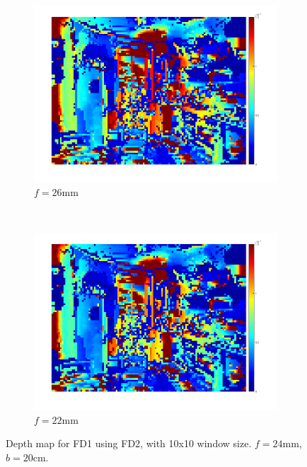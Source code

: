 \documentclass[a4paper, 10pt, conference]{ieeeconf}
\begin{document}
\begin{figure}[!ht]
  \captionsetup[subfigure]{position=b}
  \centering
    \begin{subfigure}{0.45\linewidth}
      \includegraphics[width=\textwidth]{pic/q2_2_e_focal1}
      \caption{$f = 26\text{mm}$}
      \label{fig:q2_2_e_focal1}
    \end{subfigure}
    ~
    \begin{subfigure}{0.45\linewidth}
      \includegraphics[width=\textwidth]{pic/q2_2_e_focal2}
      \caption{$f = 22\text{mm}$}
      \label{fig:q2_2_e_focal2}
    \end{subfigure}

    \caption{Depth map for FD1 using FD2, with 10x10 window size. $f = 24\text{mm}$, $b = 20\text{cm}$.}
  \label{fig:q2_2_e_focal}
\end{figure}
\end{document}
